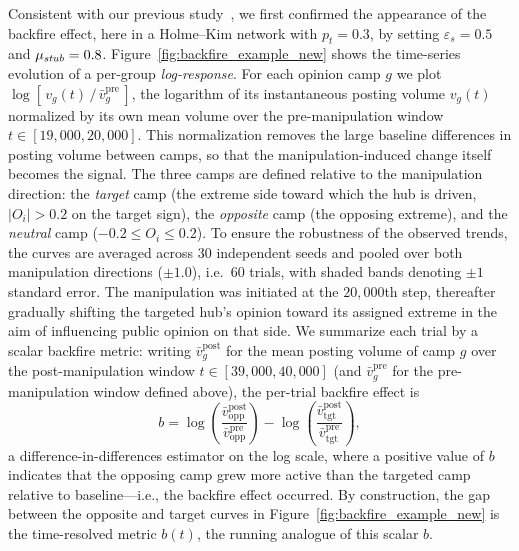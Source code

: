\documentclass[pdflatex,sn-mathphys-num]{sn-jnl}%
\theoremstyle{thmstyleone}%
\theoremstyle{thmstyletwo}%
\theoremstyle{thmstylethree}%
\def\Stubbornness{\mu_{\it stub}}
\def\ThofOpPreval{\varepsilon_s}
\begin{document}
Consistent with our previous study~\cite{Takeda2026}, we first confirmed the appearance of the backfire effect, here in a Holme--Kim network with $p_t = 0.3$, by setting $\ThofOpPreval=0.5$ and $\Stubbornness=0.8$.
Figure~\ref{fig:backfire_example_new} shows the time-series evolution 
of a per-group \emph{log-response}. For each opinion camp $g$ 
we plot $\log\!\left[\,v_g(t)\,/\,\bar v_g^{\text{pre}}\,\right]$, 
the logarithm of its instantaneous posting volume $v_g(t)$ 
normalized by its own mean volume over the pre-manipulation 
window $t \in [19{,}000, 20{,}000]$. This normalization removes 
the large baseline differences in posting volume between camps, 
so that the manipulation-induced change itself becomes the signal. 
The three camps are defined relative to the manipulation direction: 
the \emph{target} camp (the extreme side toward which the hub is 
driven, $|O_i| > 0.2$ on the target sign), the \emph{opposite} camp 
(the opposing extreme), and the \emph{neutral} 
camp ($-0.2 \le O_i \le 0.2$). To ensure the robustness of the observed 
trends, the curves are averaged across $30$ independent 
seeds and pooled over both manipulation directions ($\pm1.0$), 
i.e.\ $60$ trials, with shaded bands denoting $\pm1$ standard error. 
The manipulation was initiated at the $20{,}000$th step, 
thereafter gradually shifting the targeted hub's opinion 
toward its assigned extreme in the aim of influencing public opinion 
on that side. We summarize each trial by a scalar backfire metric: writing
$\bar{v}^{\text{post}}_{g}$ for the mean posting volume of camp $g$ over the
post-manipulation window $t \in [39{,}000, 40{,}000]$ (and $\bar{v}^{\text{pre}}_{g}$
for the pre-manipulation window defined above), the per-trial backfire effect is
\begin{equation}\label{eq:backfire}
  b = \log\!\left(\frac{\bar{v}^{\text{post}}_{\text{opp}}}{\bar{v}^{\text{pre}}_{\text{opp}}}\right)
    - \log\!\left(\frac{\bar{v}^{\text{post}}_{\text{tgt}}}{\bar{v}^{\text{pre}}_{\text{tgt}}}\right),
\end{equation}
a difference-in-differences estimator on the log scale, where a positive value of
$b$ indicates that the opposing camp grew more active than the targeted camp
relative to baseline---i.e., the backfire effect occurred. By construction, the
gap between the opposite and target curves in
Figure~\ref{fig:backfire_example_new} is the time-resolved metric $b(t)$, the
running analogue of this scalar $b$.

\par
\end{document}
